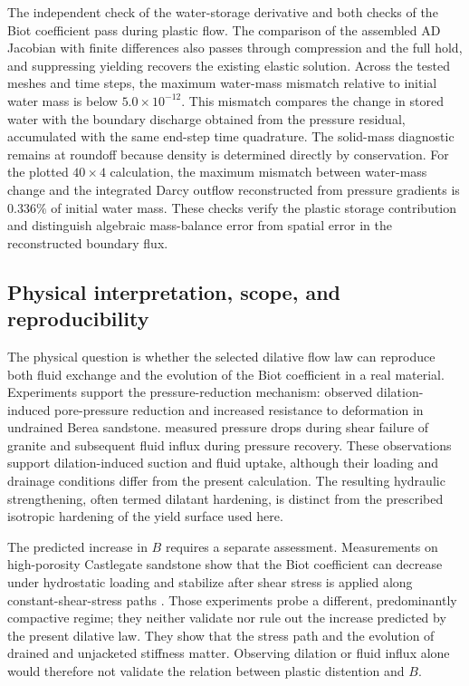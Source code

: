 The independent check of the water-storage derivative and both checks of
the Biot coefficient pass during plastic flow.  The comparison of the
assembled AD Jacobian with finite differences also passes through
compression and the full hold, and suppressing yielding recovers the
existing elastic solution.  Across the tested meshes and time steps,
the maximum water-mass mismatch relative to initial water mass is below
\(5.0\times10^{-12}\).  This mismatch compares the change in stored water
with the boundary discharge obtained from the pressure residual, accumulated
with the same end-step time quadrature.  The solid-mass diagnostic remains
at roundoff because density is determined directly by conservation.
For the plotted \(40\times4\) calculation, the maximum mismatch between
water-mass change and the integrated Darcy outflow reconstructed from pressure
gradients is \(0.336\%\) of initial water mass.  These checks verify the
plastic storage contribution and distinguish algebraic mass-balance error
from spatial error in the reconstructed boundary flux.
\FloatBarrier

\subsection{Physical interpretation, scope, and reproducibility}
\label{sec:verification-scope}

The physical question is whether the selected dilative flow law can reproduce
both fluid exchange and the evolution of the Biot coefficient in a real
material. Experiments support the pressure-reduction mechanism:
\citet{makhnenkolabuz2015} observed dilation-induced pore-pressure reduction
and increased resistance to deformation in undrained Berea sandstone.
\citet{brantut2020} measured pressure drops during shear failure of granite
and subsequent fluid influx during pressure recovery. These observations
support dilation-induced suction and fluid uptake, although their loading
and drainage conditions differ from the present calculation. The resulting
hydraulic strengthening, often termed dilatant hardening, is distinct from
the prescribed isotropic hardening of the yield surface used here.

The predicted increase in \(B\) requires a separate assessment. Measurements
on high-porosity Castlegate sandstone show that the Biot coefficient can
decrease under hydrostatic loading and stabilize after shear stress is
applied along constant-shear-stress paths \citep{ingraham2017evolution}. Those
experiments probe a different, predominantly compactive regime; they neither
validate nor rule out the increase predicted by the present dilative law.
They show that the stress path and the evolution of drained and unjacketed
stiffness matter. Observing dilation or fluid influx alone would therefore
not validate the relation between plastic distention and \(B\).

